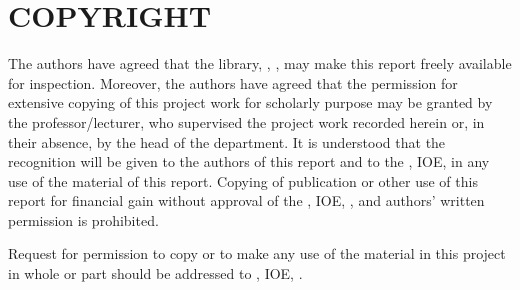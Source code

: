 \chapter*{COPYRIGHT}

The authors have agreed that the library, \cDept, \cCampus, may make this report freely available for inspection. Moreover, the authors have agreed that the permission for extensive copying of this project work for scholarly purpose may be granted by the professor/lecturer, who supervised the project work recorded herein or, in their absence, by the head of the department. It is understood that the recognition will be given to the authors of this report and to the \cDept, IOE, \cCampus in any use of the material of this report. Copying of publication or other use of this report for financial gain without approval of the \cDept, IOE, \cCampus, and authors' written permission is prohibited. 

Request for permission to copy or to make any use of the material in this project in whole or part should be addressed to \cDept, IOE, \cCampus.
